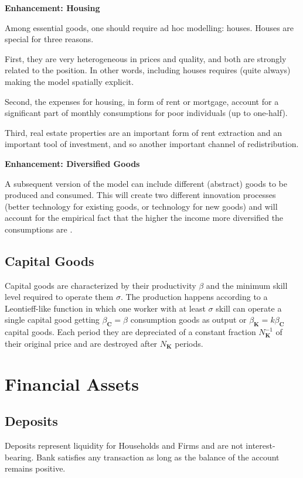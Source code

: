 \documentclass[a4paper, headings=standardclasses]{scrartcl}
\newenvironment{enh}[1][]{\begin{framed}\noindent\textbf{Enhancement: #1}\par}{\end{framed}}
\begin{document}
\begin{enh}[Housing]
    Among essential goods, one should require ad hoc modelling: houses. Houses are special for three reasons.

    First, they are very heterogeneous in prices and quality, and both are strongly related to the position. In other words, including houses requires (quite always) making the model spatially explicit.

    Second, the expenses for housing, in form of rent or mortgage, account for a significant part of monthly consumptions for poor individuals (up to one-half).

    Third, real estate properties are an important form of rent extraction and an important tool of investment, and so another important channel of redistribution.
\end{enh}

\begin{enh}[Diversified Goods]
    A subsequent version of the model can include different (abstract) goods to be produced and consumed. This will create two different innovation processes (better technology for existing goods, or technology for new goods) and will account for the empirical fact that the higher the income more diversified the consumptions are \parencite[cfr.][§2]{didomenico2022}.
\end{enh}

\subsection{Capital Goods}
Capital goods are characterized by their productivity $\beta$ and the minimum skill level required to operate them $\sigma$. The production happens according to a Leontieff-like function in which one worker with at least $\sigma$ skill can operate a single capital good getting $\beta_\mathbf{C}=\beta$ consumption goods as output or $\beta_\mathbf{K} = k \beta_\mathbf{C}$ capital goods. Each period they are depreciated of a constant fraction $N_\mathbf{K}^{-1}$ of their original price and are destroyed after $N_\mathbf{K}$ periods.

\section{Financial Assets}

\subsection{Deposits}
Deposits represent liquidity for Households and Firms and are not interest-bearing. Bank satisfies any transaction as long as the balance of the account remains positive.
\end{document}
